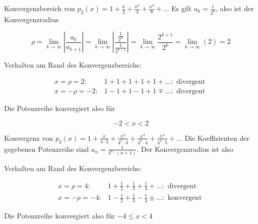 \begin{example}
    Konvergenzbereich von $p_{2}(x)=1+\frac{x}{2}+\frac{x^{2}}{4}+\frac{x^{3}}{8}+\ldots$
\tcblower
Es gilt $a_{k}=\frac{1}{2^{k}}$, also ist der Konvergenzradius

$$
\rho=\lim _{k \rightarrow \infty}\left|\frac{a_{k}}{a_{k+1}}\right|=\lim _{k \rightarrow \infty}\left|\frac{\frac{1}{2^{k}}}{\frac{1}{2^{k+1}}}\right|=\lim _{k \rightarrow \infty} \frac{2^{k+1}}{2^{k}}=\lim _{k \rightarrow \infty}(2)=2
$$

Verhalten am Rand des Konvergenzbereichs:

$$
\begin{aligned}
x=\rho=2: & 1+1+1+1+1+\ldots: \text { divergent } \\
x=-\rho=-2: & 1-1+1-1+1 \mp \ldots: \text { divergent }
\end{aligned}
$$

Die Potenzreihe konvergiert also für

$$
-2<x<2
$$
\end{example}

\begin{example}
    Konvergenz von $p_{3}(x)=1+\frac{x}{4 \cdot 2}+\frac{x^{2}}{4^{2} \cdot 3}+\frac{x^{3}}{4^{3} \cdot 4}+\frac{x^{4}}{4^{4} \cdot 5}+\ldots$
\tcblower
Die Koeffizienten der gegebenen Potenzreihe sind $a_{n}=\frac{1}{4^{n} \cdot(n+1)}$. Der Konvergenzradius ist also


Verhalten am Rand des Konvergenzbereichs:

$$
\begin{array}{cl}
x=\rho=4: & 1+\frac{1}{2}+\frac{1}{3}+\frac{1}{4}+\ldots: \text { divergent } \\
x=-\rho=-4: & 1-\frac{1}{2}+\frac{1}{3}-\frac{1}{4} \pm \ldots: \text { konvergent }
\end{array}
$$

Die Potenzreihe konvergiert also für
$
-4 \leq x<4
$
\end{example}


